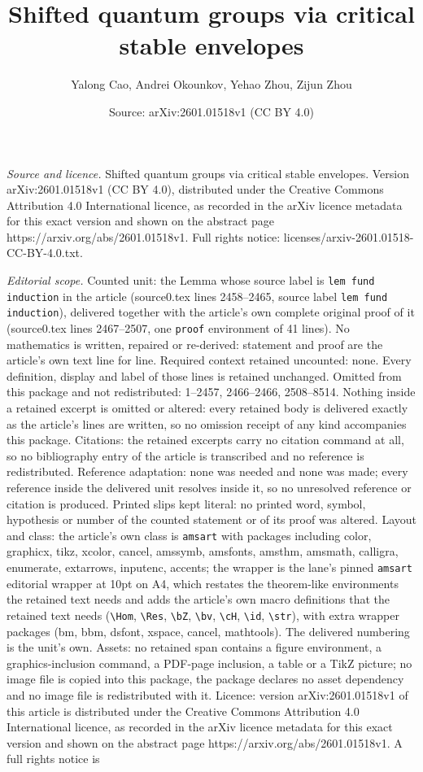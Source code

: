 \documentclass[10pt,a4paper]{amsart}
\title[Shifted quantum groups via critical stable envelopes]{Shifted quantum groups via critical stable envelopes}
\author{Yalong Cao, Andrei Okounkov, Yehao Zhou, Zijun Zhou}
\date{Source: arXiv:2601.01518v1 (CC BY 4.0)}
\begin{document}
\maketitle

\noindent\emph{Source and licence.} Shifted quantum groups via critical stable envelopes. Version arXiv:2601.01518v1 (CC BY 4.0), distributed under the Creative Commons Attribution 4.0 International licence, as recorded in the arXiv licence metadata for this exact version and shown on the abstract page https://arxiv.org/abs/2601.01518v1. Full rights notice: licenses/arxiv-2601.01518-CC-BY-4.0.txt.\par\smallskip

\noindent\textit{Editorial scope.} Counted unit: the Lemma whose source label is \texttt{lem fund induction} in the article (source0.tex lines 2458--2465, source label \texttt{lem fund induction}), delivered together with the article's own complete original proof of it (source0.tex lines 2467--2507, one \texttt{proof} environment of 41 lines). No mathematics is written, repaired or re-derived: statement and proof are the article's own text line for line. Required context retained uncounted: none. Every definition, display and label of those lines is retained unchanged. Omitted from this package and not redistributed: 1--2457, 2466--2466, 2508--8514. Nothing inside a retained excerpt is omitted or altered: every retained body is delivered exactly as the article's lines are written, so no omission receipt of any kind accompanies this package. Citations: the retained excerpts carry no citation command at all, so no bibliography entry of the article is transcribed and no reference is redistributed. Reference adaptation: none was needed and none was made; every reference inside the delivered unit resolves inside it, so no unresolved reference or citation is produced. Printed slips kept literal: no printed word, symbol, hypothesis or number of the counted statement or of its proof was altered. Layout and class: the article's own class is \texttt{amsart} with packages including color, graphicx, tikz, xcolor, cancel, amssymb, amsfonts, amsthm, amsmath, calligra, enumerate, extarrows, inputenc, accents; the wrapper is the lane's pinned \texttt{amsart} editorial wrapper at 10pt on A4, which restates the theorem-like environments the retained text needs and adds the article's own macro definitions that the retained text needs (\texttt{\textbackslash Hom}, \texttt{\textbackslash Res}, \texttt{\textbackslash bZ}, \texttt{\textbackslash bv}, \texttt{\textbackslash cH}, \texttt{\textbackslash id}, \texttt{\textbackslash str}), with extra wrapper packages (bm, bbm, dsfont, xspace, cancel, mathtools). The delivered numbering is the unit's own. Assets: no retained span contains a figure environment, a graphics-inclusion command, a PDF-page inclusion, a table or a TikZ picture; no image file is copied into this package, the package declares no asset dependency and no image file is redistributed with it. Licence: version arXiv:2601.01518v1 of this article is distributed under the Creative Commons Attribution 4.0 International licence, as recorded in the arXiv licence metadata for this exact version and shown on the abstract page https://arxiv.org/abs/2601.01518v1. A full rights notice is 
\end{document}
